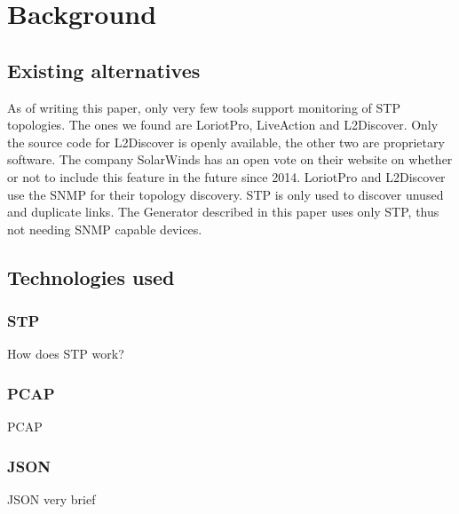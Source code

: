\chapter{Background}
\section{Existing alternatives}
As of writing this paper, only very few tools support monitoring of STP topologies.
The ones we found are LoriotPro\cite{LoriotPro}, LiveAction\cite{LiveAction} and L2Discover\cite{L2Discover}.
Only the source code for L2Discover is openly available, the other two are proprietary software.
The company SolarWinds has an open vote on their website on whether or not to include this feature in the future since 2014\cite{thwackSW}.
LoriotPro and L2Discover use the SNMP for their topology discovery.
STP is only used to discover unused and duplicate links.
The Generator described in this paper uses only STP, thus not needing SNMP capable devices.

\section{Technologies used}
\subsection{STP}

How does STP work?
\subsection{PCAP}
PCAP 
\subsection{JSON}
JSON very brief
